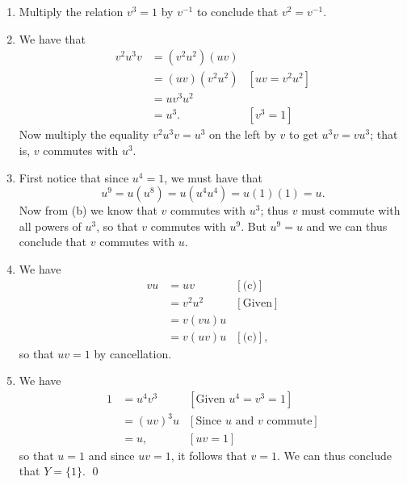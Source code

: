 \begin{enumerate}
      \begin{enumerate}
         \item Multiply the relation $v^3 = 1$ by $v^{-1}$ to conclude that
               $v^2 = v^{-1}$.
         \item We have that
               \begin{align*}
                  v^2u^3v &= (v^2u^2)(uv) \\
                          &= (uv)(v^2u^2) &[uv = v^2u^2] \\
                          &= uv^3u^2 \\
                          &= u^3. &[v^3 = 1]
               \end{align*}
               Now multiply the equality $v^2u^3v = u^3$ on the left by $v$ to
               get $u^3v = vu^3$; that is, $v$ commutes with $u^3$.
         \item First notice that since $u^4 = 1$, we must have that
               $$u^9 = u(u^8) = u(u^4u^4) = u(1)(1) = u.$$
               Now from (b) we know that $v$ commutes with $u^3$; thus $v$ must
               commute with all powers of $u^3$, so that $v$ commutes with
               $u^9$. But $u^9 = u$ and we can thus conclude that $v$ commutes
               with $u$.
         \item We have
               \begin{align*}
                  vu &= uv &[\text{(c)}] \\
                     &= v^2u^2 &[\text{Given}] \\
                     &= v(vu)u \\
                     &= v(uv)u &[\text{(c)}],
               \end{align*}
               so that $uv = 1$ by cancellation.
         \item We have
               \begin{align*}
                  1 &= u^4v^3 &[\text{Given }u^4 = v^3 = 1] \\
                    &= (uv)^3u &[\text{Since }u\text{ and }v\text{ commute}] \\
                    &= u, &[uv = 1]
               \end{align*}
               so that $u = 1$ and since $uv = 1$, it follows that $v = 1$. We
               can thus conclude that $Y = \{1\}$. \qed
      \end{enumerate}
\end{enumerate}
